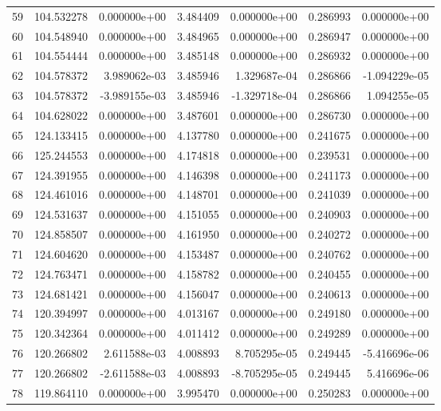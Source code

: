 \begin{tabular}{rrrrrrr}
59 & 104.532278 &  0.000000e+00 &  3.484409 &  0.000000e+00 &    0.286993 &  0.000000e+00 \\
60 & 104.548940 &  0.000000e+00 &  3.484965 &  0.000000e+00 &    0.286947 &  0.000000e+00 \\
61 & 104.554444 &  0.000000e+00 &  3.485148 &  0.000000e+00 &    0.286932 &  0.000000e+00 \\
62 & 104.578372 &  3.989062e-03 &  3.485946 &  1.329687e-04 &    0.286866 & -1.094229e-05 \\
63 & 104.578372 & -3.989155e-03 &  3.485946 & -1.329718e-04 &    0.286866 &  1.094255e-05 \\
64 & 104.628022 &  0.000000e+00 &  3.487601 &  0.000000e+00 &    0.286730 &  0.000000e+00 \\
65 & 124.133415 &  0.000000e+00 &  4.137780 &  0.000000e+00 &    0.241675 &  0.000000e+00 \\
66 & 125.244553 &  0.000000e+00 &  4.174818 &  0.000000e+00 &    0.239531 &  0.000000e+00 \\
67 & 124.391955 &  0.000000e+00 &  4.146398 &  0.000000e+00 &    0.241173 &  0.000000e+00 \\
68 & 124.461016 &  0.000000e+00 &  4.148701 &  0.000000e+00 &    0.241039 &  0.000000e+00 \\
69 & 124.531637 &  0.000000e+00 &  4.151055 &  0.000000e+00 &    0.240903 &  0.000000e+00 \\
70 & 124.858507 &  0.000000e+00 &  4.161950 &  0.000000e+00 &    0.240272 &  0.000000e+00 \\
71 & 124.604620 &  0.000000e+00 &  4.153487 &  0.000000e+00 &    0.240762 &  0.000000e+00 \\
72 & 124.763471 &  0.000000e+00 &  4.158782 &  0.000000e+00 &    0.240455 &  0.000000e+00 \\
73 & 124.681421 &  0.000000e+00 &  4.156047 &  0.000000e+00 &    0.240613 &  0.000000e+00 \\
74 & 120.394997 &  0.000000e+00 &  4.013167 &  0.000000e+00 &    0.249180 &  0.000000e+00 \\
75 & 120.342364 &  0.000000e+00 &  4.011412 &  0.000000e+00 &    0.249289 &  0.000000e+00 \\
76 & 120.266802 &  2.611588e-03 &  4.008893 &  8.705295e-05 &    0.249445 & -5.416696e-06 \\
77 & 120.266802 & -2.611588e-03 &  4.008893 & -8.705295e-05 &    0.249445 &  5.416696e-06 \\
78 & 119.864110 &  0.000000e+00 &  3.995470 &  0.000000e+00 &    0.250283 &  0.000000e+00 \\

\end{tabular}
